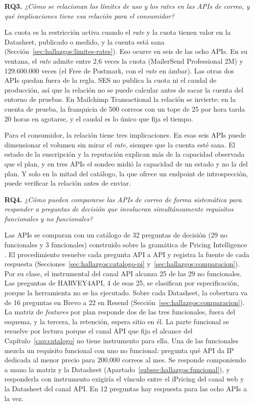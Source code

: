 \noindent\textbf{RQ3.} \emph{¿Cómo se relacionan los límites de uso y los \textit{rates} en las APIs de correo, y qué implicaciones tiene esa relación para el consumidor?}

La cuota es la restricción activa cuando el \textit{rate} y la cuota tienen valor en la Datasheet, publicado o medido, y la cuenta está sana (Sección~\ref{sec:hallazgos:limites-rates}).
Eso ocurre en seis de las ocho APIs.
En su ventana, el \textit{rate} admite entre 2,6 veces la cuota (MailerSend Professional 2M) y 129.600.000 veces (el Free de Postmark, con el \textit{rate} en ámbar).
Las otras dos APIs quedan fuera de la regla.
SES no publica la cuota ni el caudal de producción, así que la relación no se puede calcular antes de sacar la cuenta del entorno de pruebas.
En Mailchimp Transactional la relación se invierte: en la cuenta de prueba, la franquicia de 500 correos con un tope de 25 por hora tarda 20 horas en agotarse, y el caudal es lo único que fija el tiempo.

Para el consumidor, la relación tiene tres implicaciones.
En esas seis APIs puede dimensionar el volumen sin mirar el \textit{rate}, siempre que la cuenta esté sana.
El estado de la suscripción y la reputación explican más de la capacidad observada que el plan, y en tres APIs el sondeo midió la capacidad de un estado y no la del plan.
Y solo en la mitad del catálogo, la que ofrece un endpoint de introspección, puede verificar la relación antes de enviar.

\noindent\textbf{RQ4.} \emph{¿Cómo pueden compararse las APIs de correo de forma sistemática para responder a preguntas de decisión que involucran simultáneamente requisitos funcionales y no funcionales?}

Las APIs se comparan con un catálogo de 32 preguntas de decisión (29 no funcionales y 3 funcionales) construido sobre la gramática de Pricing Intelligence \citep{cavero2026pricingintelligence}.
El procedimiento resuelve cada pregunta API a API y registra la fuente de cada respuesta (Secciones~\ref{sec:hallazgos:catalogo-pi} y~\ref{sec:hallazgos:comparacion}).
Por su clase, el instrumental del canal API alcanza 25 de las 29 no funcionales.
Las preguntas de HARVEY4API, 4 de esas 25, se clasifican por especificación, porque la herramienta no se ha ejecutado.
Sobre cada Datasheet, la cobertura va de 16 preguntas en Brevo a 22 en Resend (Sección~\ref{sec:hallazgos:comparacion}).
La matriz de \textit{features} por plan responde dos de las tres funcionales, fuera del esquema, y la tercera, la retención, espera sitio en él.
La parte funcional se resuelve por lectura porque el canal API que fija el alcance del Capítulo~\ref{cap:catalogo} no tiene instrumento para ella.
Una de las funcionales mezcla un requisito funcional con uno no funcional: pregunta qué API da IP dedicada al menor precio para 200.000 correos al mes.
Se responde componiendo a mano la matriz y la Datasheet (Apartado~\ref{subsec:hallazgos:funcional}), y responderla con instrumento exigiría el vínculo entre el iPricing del canal web y la Datasheet del canal API.
En 12 preguntas hay respuesta para las ocho APIs a la vez.

